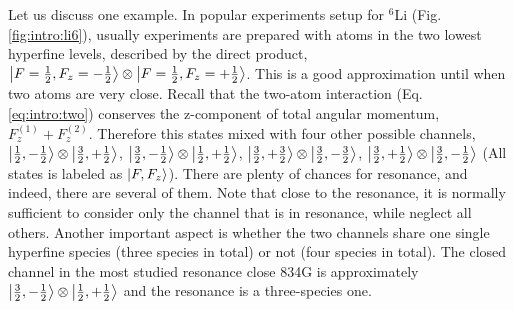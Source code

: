 Let us discuss one example.  In popular experiments setup for $^{6}$Li (Fig. \ref{fig:intro:li6}), usually experiments are prepared with atoms in the two lowest hyperfine levels, described by the  direct product, $\left|F=\frac{1}{2},F_{z}=-\frac{1}{2}\right>\otimes\left|F=\frac{1}{2},F_{z}=+\frac{1}{2}\right>$.  This is a good approximation until when two atoms are very close.  Recall that the two-atom interaction (Eq. \ref{eq:intro:two}) conserves the z-component of total angular momentum, $F_{z}^{(1)}+F_{z}^{(2)}$.  Therefore this states mixed with four other possible channels, $\left|\frac{1}{2},-\frac{1}{2}\right>\otimes\left|\frac{3}{2},+\frac{1}{2}\right>$, $\left|\frac{3}{2},-\frac{1}{2}\right>\otimes\left|\frac{1}{2},+\frac{1}{2}\right>$, $\left|\frac{3}{2},+\frac{3}{2}\right>\otimes\left|\frac{3}{2},-\frac{3}{2}\right>$, $\left|\frac{3}{2},+\frac{1}{2}\right>\otimes\left|\frac{3}{2},-\frac{1}{2}\right>$ (All states is labeled as $\left|F,F_{z}\right>$).  There are plenty of chances for resonance, and indeed, there are several of them.  Note that close to the resonance, it is normally sufficient to consider only the  channel that is in resonance, while neglect all others.  Another important aspect is whether the two channels share one single hyperfine species (three species in total) or not (four species in total).   The closed channel in the most studied resonance close 834G is approximately $\left|\frac{3}{2},-\frac{1}{2}\right>\otimes\left|\frac{1}{2},+\frac{1}{2}\right>$ and the resonance is a three-species one\cite{ZhangThesis,ChinRMP}. 

